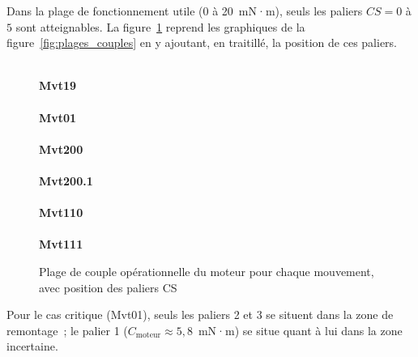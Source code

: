 Dans la plage de fonctionnement utile (0 à 20~mN·m), seuls les paliers
$CS = 0$ à $5$ sont atteignables. La figure~\ref{fig:plages_couples_paliers}
reprend les graphiques de la figure~\ref{fig:plages_couples} en y ajoutant,
en traitillé, la position de ces paliers.

\begin{figure}[H]
  \centering
  \\[3mm]
  \textbf{Mvt19}\\[1mm]
  \\[3mm]
  \textbf{Mvt01}\\[1mm]
  \\[3mm]
  \textbf{Mvt200}\\[1mm]
  \\[3mm]
  \textbf{Mvt200.1}\\[1mm]
  \\[3mm]
  \textbf{Mvt110}\\[1mm]
  \\[3mm]
  \textbf{Mvt111}\\[1mm]
  \caption{Plage de couple opérationnelle du moteur pour chaque mouvement, avec position des paliers CS}
  \label{fig:plages_couples_paliers}
\end{figure}

Pour le cas critique (Mvt01), seuls les paliers 2 et 3 se situent dans la
zone de remontage~; le palier 1 ($C_{\text{moteur}} \approx 5{,}8$~mN·m) se
situe quant à lui dans la zone incertaine.

